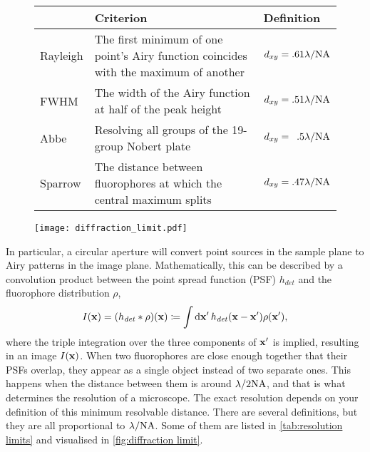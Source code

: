 \begin{figure}[!t]
	\centering
	\begin{tabularx}{\linewidth}{lXl}
		\toprule
		& Criterion                                                                            & Definition                            \\ \midrule
		Rayleigh & The first minimum of one point's Airy function coincides with the maximum of another & $ d_{xy} = .61\lambda/\mathrm{NA} $           \\
		FWHM     & The width of the Airy function at half of the peak height                            & $ d_{xy} = .51\lambda/\mathrm{NA} $           \\
		Abbe     & Resolving all groups of the 19-group Nobert plate \cite{Abbe1873, Norbert}                                  & $ d_{xy} = \phantom{1}.5\lambda/\mathrm{NA} $ \\
		Sparrow  & The distance between fluorophores at which the central maximum splits                & $ d_{xy} = .47 \lambda/\mathrm{NA} $          \\ \bottomrule
	\end{tabularx}
	\label{tab:resolution limits}
	
	\centering
	\texttt{[image: diffraction\_limit.pdf]}
	\label{fig:diffraction limit}
\end{figure}

In particular, a circular aperture will convert point sources in the sample plane to Airy patterns in the image plane. Mathematically, this can be described by a convolution product between the point spread function (PSF) $ h_\mathit{det} $ and the fluorophore distribution $ \rho $,
\begin{equation}
	I(\vb{x}) = (h_\mathit{det} * \rho)(\vb{x}) \coloneqq \int\dd{\vb{x}'} h_\mathit{det}(\vb{x}-\vb{x}')\rho(\vb{x}'),
	\label{eq:convolution}
\end{equation}
where the triple integration over the three components of $ \vb{x}' $ is implied, resulting in an image $ I(\vb{x}) $. When two fluorophores are close enough together that their PSFs overlap, they appear as a single object instead of two separate ones. This happens when the distance between them is around $ \lambda/2\mathrm{NA} $, and that is what determines the resolution of a microscope. The exact resolution depends on your definition of this minimum resolvable distance. There are several definitions, but they are all proportional to $ \lambda/\mathrm{NA} $. Some of them are listed in \autoref{tab:resolution limits} and visualised in \autoref{fig:diffraction limit}.



